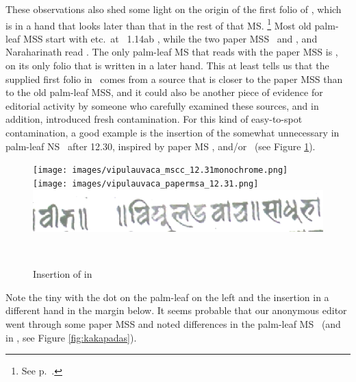 \label{msCcfirstfoliokakapada}
These observations also shed some light on
the origin of the first folio of \msCc, which is in 
a hand that looks later than that in the rest of that MS.%
		\footnote{See p.~\pageref{msCcfirstfolio}.}			 
Most old palm-leaf MSS start with 
etc.\ at \VSS\ 1.14ab , while the two 
paper MSS \msPaperA\ and \msPaperC, 
and Naraharinath read . The only palm-leaf MS that reads with 
the paper MSS is \msCc, on its only folio that is
written in a later hand. This at least tells us that
the supplied first folio in \msCc\ comes from a
source that is closer to the paper MSS than to the
old palm-leaf MSS, and it could also be another piece
of evidence for editorial activity by someone who
carefully examined these sources, and in addition,
introduced fresh contamination. For this kind
of easy-to-spot contamination, a good example is
the insertion of the somewhat unnecessary
 in palm-leaf NS \msCc\ after 12.30,
inspired by paper MS \msPaperA, 
and/or \msPaperC\ (see Figure \ref{fig:vipulauvaca}).
\begin{figure} 
\hfill
\texttt{[image: images/vipulauvaca\_mscc\_12.31monochrome.png]}
\hfill
\texttt{[image: images/vipulauvaca\_papermsa\_12.31.png]}
\hfill
\includegraphics[scale=.2]{images/vipulauvaca_msPaperC223v.png}
\hfill

\hspace{2em}
\msCc\ \verso
\hspace{5em}
\msPaperA\ \recto
\hspace{6em}
\msPaperC\ \verso
\hspace{3em}
\caption{Insertion of  in \msCc\label{fig:vipulauvaca}}
\end{figure}
Note the tiny  with the dot
on the palm-leaf on the left and
the insertion in a different hand in the margin below.
It seems probable that our anonymous editor
went through some paper MSS and noted differences
in the palm-leaf MS \msCc\ (and in \msNa, see Figure
\ref{fig:kakapadas}). 

\medskip

